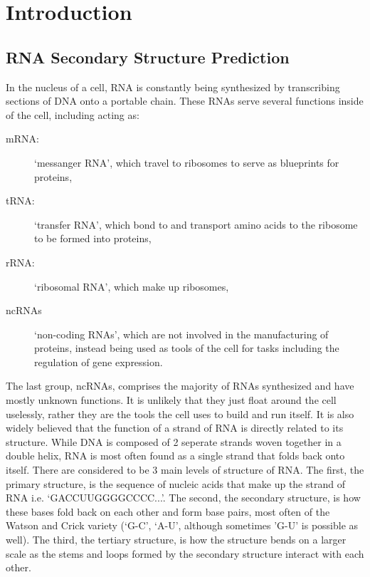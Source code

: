 \newcommand{\stack}[2]{\begin{array}{c}{ #1 \\ #2 }\end{array}}

\chapter{Introduction}

\section{RNA Secondary Structure Prediction}

In the nucleus of a cell, RNA is constantly being synthesized by
transcribing sections of DNA onto a portable chain. These RNAs serve
several functions inside of the cell, including acting as:

\begin{description}
\item[mRNA:] `messanger RNA', which travel to ribosomes to serve as blueprints for
  proteins,
\item[tRNA:] `transfer RNA', which bond to and transport amino acids
  to the ribosome to be formed into proteins,
\item[rRNA:] `ribosomal RNA', which make up ribosomes,
\item[ncRNAs] `non-coding RNAs', which are not involved in the
  manufacturing of proteins, instead being used as tools of the cell
  for tasks including the regulation of gene expression.
\end{description} 

The last group, ncRNAs, comprises the majority of RNAs synthesized and
have mostly unknown functions. It is unlikely that they just float
around the cell uselessly, rather they are the tools the cell uses to
build and run itself. It is also widely believed that the function of
a strand of RNA is directly related to its structure. While DNA is
composed of 2 seperate strands woven together in a double helix, RNA
is most often found as a single strand that folds back onto
itself. There are considered to be 3 main levels of structure of
RNA. The first, the primary structure, is the sequence of nucleic
acids that make up the strand of RNA i.e. `GACCUUGGGGCCCC...'. The
second, the secondary structure, is how these bases fold back on each
other and form base pairs, most often of the Watson and Crick variety
(`G-C', `A-U', although sometimes 'G-U' is possible as well). The
third, the tertiary structure, is how the structure bends on a larger
scale as the stems and loops formed by the secondary structure
interact with each other.

